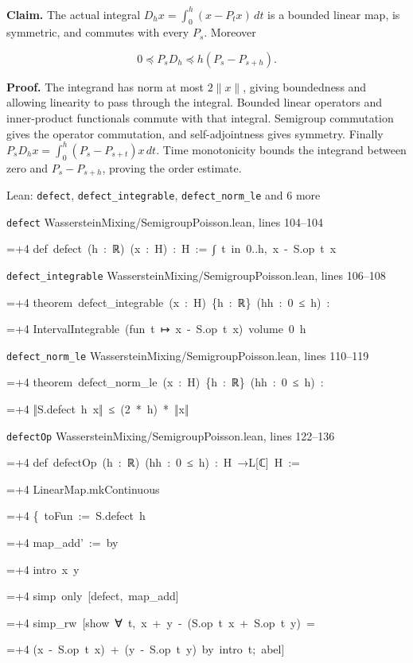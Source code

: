 \documentclass[11pt,a4paper]{report}
\newlength{\leancharwidth}
\newenvironment{leancode}{\par\smallskip\begingroup\ttfamily\footnotesize\raggedright
  \settowidth{\leancharwidth}{M}\setlength{\parskip}{0pt}\setlength{\parindent}{0pt}
  \frenchspacing}{\par\endgroup\smallskip}
\newcommand{\leanline}[2]{\hangindent=\dimexpr#1\leancharwidth+4\leancharwidth\relax
  \hangafter=1\noindent\hspace*{#1\leancharwidth}#2\par}
\newcommand{\leansource}[1]{\par{\footnotesize\color{leanmuted}#1}\par}
\begin{document}
\textbf{Claim.} The actual integral \(D_hx=\int_0^h(x-P_tx)\,dt\) is a bounded linear map, is symmetric, and commutes with every \(P_s\). Moreover

\[0\preceq P_sD_h\preceq h(P_s-P_{s+h}).\]

\textbf{Proof.} The integrand has norm at most \(2\|x\|\), giving boundedness and allowing linearity to pass through the integral. Bounded linear operators and inner-product functionals commute with that integral. Semigroup commutation gives the operator commutation, and self-adjointness gives symmetry. Finally \(P_sD_hx=\int_0^h(P_s-P_{s+t})x\,dt\). Time monotonicity bounds the integrand between zero and \(P_s-P_{s+h}\), proving the order estimate.

\begin{leanbox}{Lean: \texttt{defect}, \texttt{defect\_\allowbreak{}integrable}, \texttt{defect\_\allowbreak{}norm\_\allowbreak{}le} and 6 more}
\leansource{\texttt{defect} \quad WassersteinMixing/\allowbreak{}SemigroupPoisson.lean, lines 104–104}
\begin{leancode}
\leanline{0}{def\ defect\ (h\ :\ ℝ)\ (x\ :\ H)\ :\ H\ :=\ ∫\ t\ in\ 0..h,\ x\ -\ S.op\ t\ x}
\end{leancode}
\leansource{\texttt{defect\_\allowbreak{}integrable} \quad WassersteinMixing/\allowbreak{}SemigroupPoisson.lean, lines 106–108}
\begin{leancode}
\leanline{0}{theorem\ defect\_integrable\ (x\ :\ H)\ \{h\ :\ ℝ\}\ (hh\ :\ 0\ ≤\ h)\ :}
\leanline{4}{IntervalIntegrable\ (fun\ t\ ↦\ x\ -\ S.op\ t\ x)\ volume\ 0\ h}
\end{leancode}
\leansource{\texttt{defect\_\allowbreak{}norm\_\allowbreak{}le} \quad WassersteinMixing/\allowbreak{}SemigroupPoisson.lean, lines 110–119}
\begin{leancode}
\leanline{0}{theorem\ defect\_norm\_le\ (x\ :\ H)\ \{h\ :\ ℝ\}\ (hh\ :\ 0\ ≤\ h)\ :}
\leanline{4}{‖S.defect\ h\ x‖\ ≤\ (2\ *\ h)\ *\ ‖x‖}
\end{leancode}
\leansource{\texttt{defectOp} \quad WassersteinMixing/\allowbreak{}SemigroupPoisson.lean, lines 122–136}
\begin{leancode}
\leanline{0}{def\ defectOp\ (h\ :\ ℝ)\ (hh\ :\ 0\ ≤\ h)\ :\ H\ →L[ℂ]\ H\ :=}
\leanline{2}{LinearMap.mkContinuous}
\leanline{4}{\{\ toFun\ :=\ S.defect\ h}
\leanline{6}{map\_add'\ :=\ by}
\leanline{8}{intro\ x\ y}
\leanline{8}{simp\ only\ [defect,\ map\_add]}
\leanline{8}{simp\_rw\ [show\ ∀\ t,\ x\ +\ y\ -\ (S.op\ t\ x\ +\ S.op\ t\ y)\ =}
\leanline{10}{(x\ -\ S.op\ t\ x)\ +\ (y\ -\ S.op\ t\ y)\ by\ intro\ t;\ abel]}

\end{leancode}
\end{leanbox}
\end{document}
